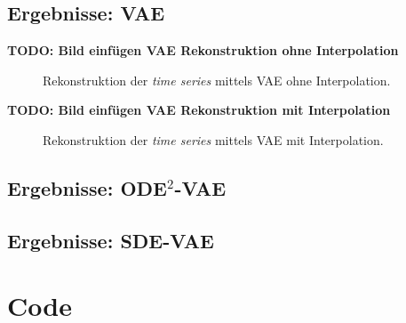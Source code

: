 \documentclass[12pt]{article}
\begin{document}
	\subsection[VAE]{Ergebnisse: VAE}
	
	\textbf{TODO: Bild einfügen VAE Rekonstruktion ohne Interpolation}
	\begin{figure}[!htbp]
		\centering
		\caption{Rekonstruktion der \emph{time series} mittels VAE ohne Interpolation.}
	\end{figure}
	\textbf{TODO: Bild einfügen VAE Rekonstruktion mit Interpolation}
	\begin{figure}[!htbp]
		\centering
		\caption{Rekonstruktion der \emph{time series} mittels VAE mit Interpolation.}
	\end{figure}
	\newpage
	\subsection[ODE$^2$-VAE]{Ergebnisse: ODE$^2$-VAE}

	\newpage
	\subsection[SDE-VAE]{Ergebnisse: SDE-VAE}
	\newpage
	\section[Code]{Code}
	
\end{document}
